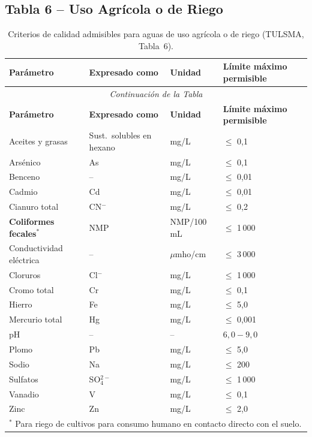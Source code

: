 \documentclass[12pt,a4paper]{article}
\begin{document}
\subsection{Tabla 6 -- Uso Agr\'icola o de Riego}

\small
\begin{longtable}{p{4.5cm}p{2.0cm}p{2.0cm}p{3.5cm}}
\caption{Criterios de calidad admisibles para aguas de uso agr\'icola o de riego (TULSMA, Tabla~6).}\\
\toprule
\textbf{Par\'ametro} & \textbf{Expresado como} & \textbf{Unidad} & \textbf{L\'imite m\'aximo permisible} \\
\midrule
\endfirsthead
\multicolumn{4}{c}{\small\itshape Continuaci\'on de la Tabla}\\
\toprule
\textbf{Par\'ametro} & \textbf{Expresado como} & \textbf{Unidad} & \textbf{L\'imite m\'aximo permisible} \\
\midrule
\endhead
\bottomrule
\endlastfoot
Aceites y grasas & Sust.\ solubles en hexano & mg/L & $\leq$ 0,1 \\
Ars\'enico & As & mg/L & $\leq$ 0,1 \\
Benceno & -- & mg/L & $\leq$ 0,01 \\
Cadmio & Cd & mg/L & $\leq$ 0,01 \\
Cianuro total & CN$^-$ & mg/L & $\leq$ 0,2 \\
\textbf{Coliformes fecales}$^*$ & NMP & NMP/100 mL & $\leq$ 1\,000 \\
Conductividad el\'ectrica & -- & $\mu$mho/cm & $\leq$ 3\,000 \\
Cloruros & Cl$^-$ & mg/L & $\leq$ 1\,000 \\
Cromo total & Cr & mg/L & $\leq$ 0,1 \\
Hierro & Fe & mg/L & $\leq$ 5,0 \\
Mercurio total & Hg & mg/L & $\leq$ 0,001 \\
pH & -- & -- & $6,0 - 9,0$ \\
Plomo & Pb & mg/L & $\leq$ 5,0 \\
Sodio & Na & mg/L & $\leq$ 200 \\
Sulfatos & SO$_4^{2-}$ & mg/L & $\leq$ 1\,000 \\
Vanadio & V & mg/L & $\leq$ 0,1 \\
Zinc & Zn & mg/L & $\leq$ 2,0 \\
\multicolumn{4}{l}{\scriptsize $^*$ Para riego de cultivos para consumo humano en contacto directo con el suelo.}\\
\end{longtable}
\normalsize
\end{document}
